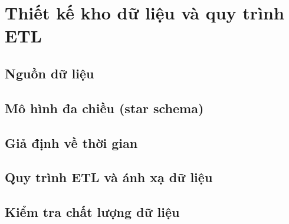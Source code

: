 \chapter{Thiết kế kho dữ liệu và quy trình ETL}
\section{Nguồn dữ liệu}
\section{Mô hình đa chiều (star schema)}
\section{Giả định về thời gian}
\section{Quy trình ETL và ánh xạ dữ liệu}
\section{Kiểm tra chất lượng dữ liệu}
